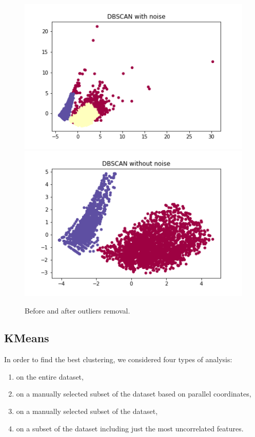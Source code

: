 \documentclass[12pt]{article}
\begin{document}
\begin{figure}[!h]
\centering
  \includegraphics[scale=0.4]{images/figure_DBSCAN_outlier_removal_1.png}
\endminipage\hfill
{}
\centering
  \includegraphics[scale=0.4]{images/figure_DBSCAN_outlier_removal_2.png}
\endminipage\hfill
\caption{Before and after outliers removal.}
\label{fig:outliersremoval}
\end{figure}

\subsection{KMeans}
In order to find the best clustering, we considered four types of analysis:
\begin{enumerate}
    \item on the entire dataset,
    \item on a manually selected subset of the dataset based on parallel coordinates,
    \item on a manually selected subset of the dataset,
    \item on a subset of the dataset including just the most uncorrelated features.
\end{enumerate}
\end{document}

